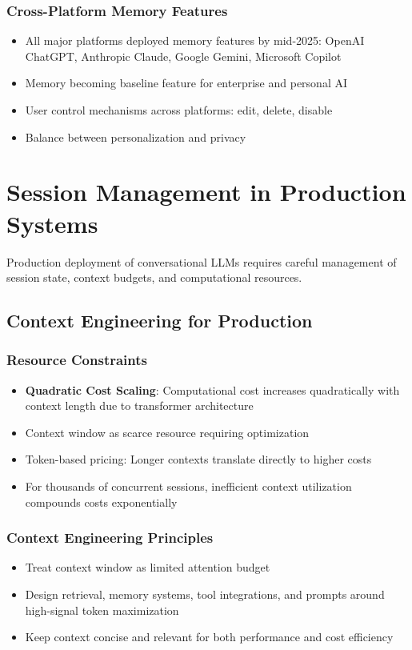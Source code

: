\documentclass[11pt,letterpaper]{article}
\begin{document}
\subsubsection{Cross-Platform Memory Features}
\begin{itemize}[leftmargin=*]
    \item All major platforms deployed memory features by mid-2025: OpenAI ChatGPT, Anthropic Claude, Google Gemini, Microsoft Copilot
    \item Memory becoming baseline feature for enterprise and personal AI
    \item User control mechanisms across platforms: edit, delete, disable
    \item Balance between personalization and privacy
\end{itemize}

\section{Session Management in Production Systems}

Production deployment of conversational LLMs requires careful management of session state, context budgets, and computational resources.

\subsection{Context Engineering for Production}

\subsubsection{Resource Constraints}
\begin{itemize}[leftmargin=*]
    \item \textbf{Quadratic Cost Scaling}: Computational cost increases quadratically with context length due to transformer architecture
    \item Context window as scarce resource requiring optimization
    \item Token-based pricing: Longer contexts translate directly to higher costs
    \item For thousands of concurrent sessions, inefficient context utilization compounds costs exponentially
\end{itemize}

\subsubsection{Context Engineering Principles}
\begin{itemize}[leftmargin=*]
    \item Treat context window as limited attention budget
    \item Design retrieval, memory systems, tool integrations, and prompts around high-signal token maximization
    \item Keep context concise and relevant for both performance and cost efficiency
\end{itemize}
\end{document}
